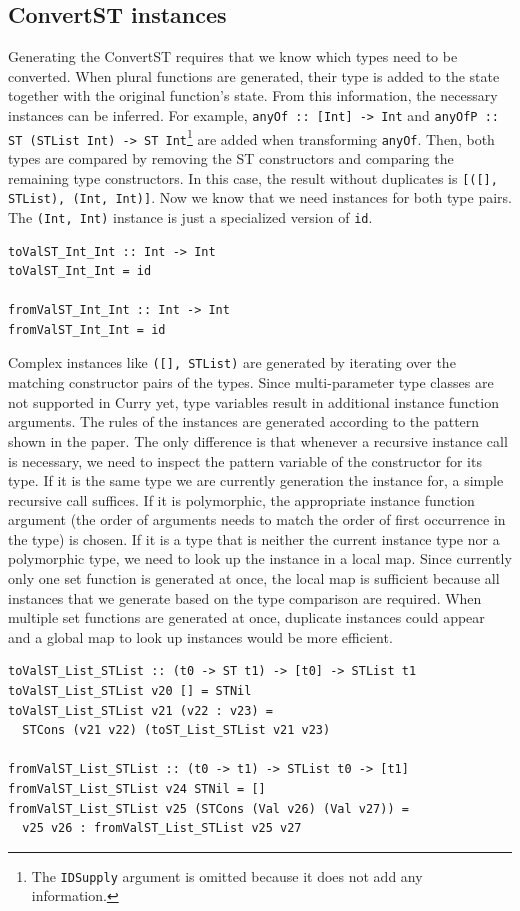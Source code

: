 \documentclass[a4paper, 11pt, fleqn]{scrreprt}
\newcommand{\cinline}[1]{\texttt{#1}}
\begin{document}
\subsection{ConvertST instances}
Generating the ConvertST requires that we know which types need to be converted. When plural functions are generated, their type is added to the state together with the original function's state. From this information, the necessary instances can be inferred.
For example, \cinline{anyOf :: [Int] -> Int} and \cinline{anyOfP :: ST (STList Int) -> ST Int}\footnote{The \cinline{IDSupply} argument is omitted because it does not add any information.} are added when transforming \cinline{anyOf}. Then, both types are compared by removing the ST constructors and comparing the remaining type constructors. In this case, the result without duplicates is \cinline{[([], STList), (Int, Int)]}. Now we know that we need instances for both type pairs. The \cinline{(Int, Int)} instance is just a specialized version of \cinline{id}.
\begin{verbatim}
toValST_Int_Int :: Int -> Int
toValST_Int_Int = id

fromValST_Int_Int :: Int -> Int
fromValST_Int_Int = id
\end{verbatim}
Complex instances like \cinline{([], STList)} are generated by iterating over the matching constructor pairs of the types. Since multi-parameter type classes are not supported in Curry yet, type variables result in additional instance function arguments. The rules of the instances are generated according to the pattern shown in the paper. The only difference is that whenever a recursive instance call is necessary, we need to inspect the pattern variable of the constructor for its type. If it is the same type we are currently generation the instance for, a simple recursive call suffices. If it is polymorphic, the appropriate instance function argument (the order of arguments needs to match the order of first occurrence in the type) is chosen. If it is a type that is neither the current instance type nor a polymorphic type, we need to look up the instance in a local map. Since currently only one set function is generated at once, the local map is sufficient because all instances that we generate based on the type comparison are required. When multiple set functions are generated at once, duplicate instances could appear and a global map to look up instances would be more efficient.

\begin{verbatim}
toValST_List_STList :: (t0 -> ST t1) -> [t0] -> STList t1
toValST_List_STList v20 [] = STNil
toValST_List_STList v21 (v22 : v23) =
  STCons (v21 v22) (toST_List_STList v21 v23)

fromValST_List_STList :: (t0 -> t1) -> STList t0 -> [t1]
fromValST_List_STList v24 STNil = []
fromValST_List_STList v25 (STCons (Val v26) (Val v27)) =
  v25 v26 : fromValST_List_STList v25 v27
\end{verbatim}
\end{document}
